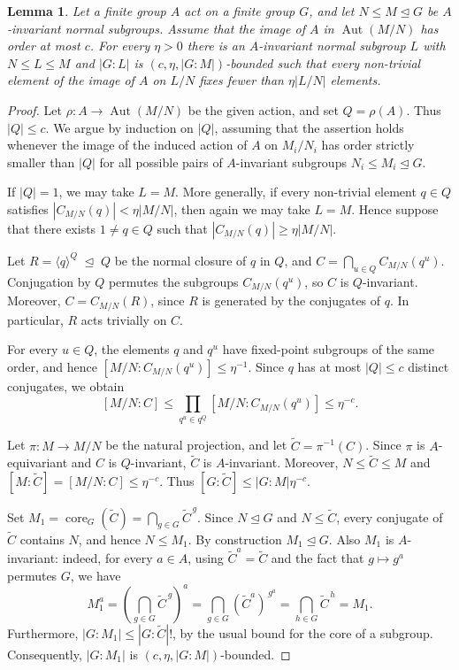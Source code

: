 \documentclass[10pt,a4paper]{amsart}
\numberwithin{equation}{section}
\newtheorem{lem}[equation]{Lemma}
\newcommand{\Aut}{\operatorname{Aut} }
\newcommand{\normaleq}{\trianglelefteq}
\begin{document}
\begin{lem}\label{lem:fixed-point-pruning}
Let a finite group $A$ act on a finite group $G$, and let
$N\leqslant M\unlhd G$ be $A$-invariant normal subgroups. Assume that
the image of $A$ in $\Aut(M/N)$ has order at most $c$. For every $\eta>0$
there is an $A$-invariant normal subgroup $L$ with $N\leqslant L\leqslant
M$ and $|G:L|$ is $(c,\eta,|G:M|)$-bounded such that every non-trivial
element of the image of $A$ on $L/N$ fixes fewer than $\eta|L/N|$
elements.
\end{lem}
\begin{proof}
Let $\rho:A\to\Aut(M/N)$ be the given action, and set $Q=\rho(A)$. Thus $|Q|\leqslant c$. We argue by induction on $|Q|$, assuming that the assertion holds whenever the image of the induced action of $A$ on $M_i/N_i$ has order strictly smaller than $|Q|$ for all possible pairs of $A$-invariant subgroups $N_i \leqslant M_i \normaleq G$.

If $|Q|=1$, we may take $L=M$. More generally, if every non-trivial element $q\in Q$ satisfies $|C_{M/N}(q)|<\eta|M/N|$, then again we may take $L=M$. Hence suppose that there exists $1\neq q\in Q$ such that $|C_{M/N}(q)|\geqslant\eta|M/N|$.

Let $R=\langle q\rangle^Q \; \unlhd \; Q$ be the normal closure of $q$ in $Q$, and  $C=\bigcap_{u\in Q}C_{M/N}(q^u)$. Conjugation by $Q$ permutes the subgroups $C_{M/N}(q^u)$, so $C$ is $Q$-invariant. Moreover, $C=C_{M/N}(R)$, since $R$ is generated by the conjugates of $q$. In particular, $R$ acts trivially on $C$.

For every $u\in Q$, the elements $q$ and $q^u$ have fixed-point subgroups of the same order, and hence $[M/N:C_{M/N}(q^u)]\leqslant\eta^{-1}$. Since $q$ has at most $|Q|\leqslant c$ distinct conjugates, we obtain
$$
[M/N:C]
\leqslant
\prod_{q^u\in q^Q}[M/N:C_{M/N}(q^u)]
\leqslant \eta^{-c}.
$$

Let $\pi:M\to M/N$ be the natural projection, and let $\widetilde C=\pi^{-1}(C)$. Since $\pi$ is $A$-equivariant and $C$ is $Q$-invariant, $\widetilde C$ is $A$-invariant. Moreover, $N\leqslant\widetilde C\leqslant M$ and $[M:\widetilde C]=[M/N:C]\leqslant\eta^{-c}$. Thus $[G:\widetilde C]\leqslant |G:M|\eta^{-c}$.

Set $M_1=\operatorname{core}_G(\widetilde C)=\bigcap_{g\in G}\widetilde C^{\,g}$. Since $N\unlhd G$ and $N\leqslant\widetilde C$, every conjugate of $\widetilde C$ contains $N$, and hence $N\leqslant M_1$. By construction $M_1\unlhd G$. Also $M_1$ is $A$-invariant: indeed, for every $a\in A$, using $\widetilde C^a=\widetilde C$ and the fact that $g\mapsto g^a$ permutes $G$, we have
$$
M_1^a
=
\left(\bigcap_{g\in G}\widetilde C^{\,g}\right)^a
=
\bigcap_{g\in G}(\widetilde C^a)^{\,g^a}
=
\bigcap_{h\in G}\widetilde C^{\,h}
=
M_1.
$$
Furthermore, $|G:M_1|\leqslant |G:\widetilde C|!$, by the usual bound for the core of a subgroup. Consequently, $|G:M_1|$ is $(c,\eta,|G:M|)$-bounded.


\end{proof}
\end{document}
